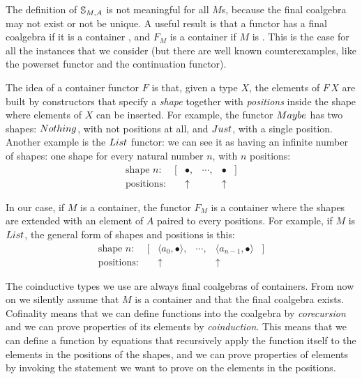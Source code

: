 The definition of $\mathbb{S}_{M,A}$ is not meaningful for all $M$s, because the final coalgebra may not exist or not be unique.
A useful result is that a functor has a final coalgebra if it is a container \cite{AAG:2005}, and $F_M$ is a container if $M$ is \cite{capretta/fowler:2017}.
This is the case for all the instances that we consider (but there are well known counterexamples, like the powerset functor and the continuation functor).

The idea of a container functor $F$ is that, given a type $X$, the elements of $F\,X$ are built by constructors that specify a {\em shape} together with {\em positions} inside the shape where elements of $X$ can be inserted.
For example, the functor $\maybe$ has two shapes: $\nothing$, with not positions at all, and $\just$, with a single position.
Another example is the $\lstsym$ functor: we can see it as having an infinite number of shapes: one shape for every natural number $n$, with $n$ positions:
$$
\begin{array}{llcll}
\mbox{shape $n$: } \quad [ & \bullet,  & \cdots ,  & \bullet & ]\\
\mbox{positions: }     & \uparrow &       & \uparrow
\end{array}
$$

In our case, if $M$ is a container, the functor $F_M$ is a container where the shapes are extended with an element of $A$ paired to every positions.
For example, if $M$ is $\lstsym$, the general form of shapes and positions is this:
$$
\begin{array}{lrcrl}
\mbox{shape $n$: } \quad [ & \langle a_0, \bullet\rangle,  
                           & \cdots ,  
                           & \langle a_{n-1}, \bullet \rangle & ]\\
\mbox{positions: }     & \uparrow\hspace{6pt} &       & \uparrow\hspace{4pt}
\end{array}
$$

The coinductive types we use are always final coalgebras of containers.
From now on we silently assume that $M$ is a container and that the final coalgebra exists.
Cofinality means that we can define functions into the coalgebra by {\em corecursion} and we can prove properties of its elements by {\em coinduction}.
This means that we can define a function by equations that recursively apply the function itself to the elements in the positions of the shapes, and we can prove properties of elements by invoking the statement we want to prove on the elements in the positions.


